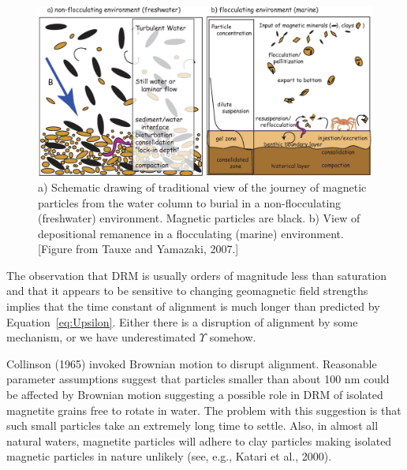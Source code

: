 \begin{figure}[htb]
\centering  \includegraphics[width=14 cm]{EPSfiles/drmprocesses.eps}
\caption{a) Schematic drawing of traditional view of the journey of magnetic particles from the water column to burial in a non-flocculating (freshwater) environment. Magnetic particles are black.  b) View of depositional remanence in a flocculating (marine) environment.  [Figure from Tauxe and Yamazaki, 2007.] }
\label{fig:drmprocesses}
\end{figure}\nocite{tauxe07}



The observation that DRM is usually orders of magnitude less than saturation and that it appears to be sensitive to changing geomagnetic field strengths implies that the time constant of alignment is much longer than predicted by Equation~\ref{eq:Upsilon}.   Either there is a disruption of alignment by some mechanism, or we have underestimated $\Upsilon$ somehow.  

Collinson (1965) \nocite{collinson65} invoked Brownian motion to disrupt alignment.  Reasonable parameter assumptions suggest that particles smaller than about 100 nm could be affected by Brownian motion suggesting a possible role in DRM of isolated magnetite grains free to rotate in water.   The problem with this suggestion is that such small particles take an extremely long time to settle.  Also, in almost all natural waters, magnetite particles will adhere to clay particles making isolated magnetic particles  in nature unlikely (see, e.g., Katari et al., 2000). \nocite{katari00}     


